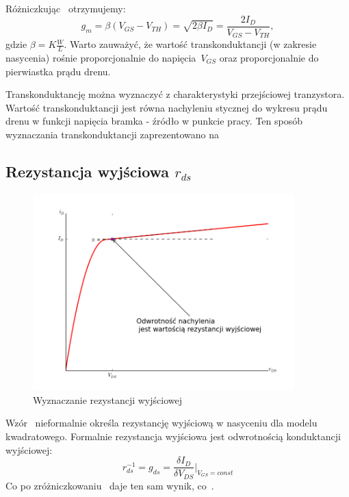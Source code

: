 \documentclass[twoside,pl,final]{labman}
\begin{document}
Różniczkując~ otrzymujemy:
\begin{equation}
  g_m = \beta (V_{GS} - V_{TH}) = \sqrt{2 \beta I_D} = \frac{2 I_D}{V_{GS} - V_{TH}},
  \label{eqn:squarelaw:gm}
\end{equation}
gdzie $\beta = K \frac{W}{L}$.
Warto zauważyć, że wartość transkonduktancji (w zakresie nasycenia)
rośnie proporcjonalnie do napięcia~$V_{GS}$ oraz
proporcjonalnie do pierwiastka prądu drenu.

Transkonduktancję można wyznaczyć z charakterystyki przejściowej tranzystora.
Wartość transkonduktancji jest równa nachyleniu stycznej
do wykresu prądu drenu w funkcji napięcia bramka - źródło w punkcie pracy.
Ten sposób wyznaczania transkonduktancji zaprezentowano na~

\FloatBarrier
\subsection{Rezystancja wyjściowa $r_{ds}$}
\label{model:squarelaw:ro}

\begin{figure}[!htbp]
  \centering
  \includegraphics[width=0.9\textwidth]{ro}
  \caption{Wyznaczanie rezystancji wyjściowej}
  \label{fig:squarelaw:ro}
\end{figure}

Wzór~ nieformalnie określa rezystancję
wyjściową w nasyceniu dla modelu kwadratowego.
Formalnie rezystancja wyjściowa jest odwrotnością konduktancji wyjściowej:
\begin{equation}
  r_{ds} ^ {-1} = g_{ds} = \frac{\delta I_D}{\delta V_{DS}} \Bigg\vert_{V_{GS} = const}
  \label{eqn:ro:deriv}
\end{equation}
Co po zróżniczkowaniu~ daje ten sam wynik, co~.
\end{document}
